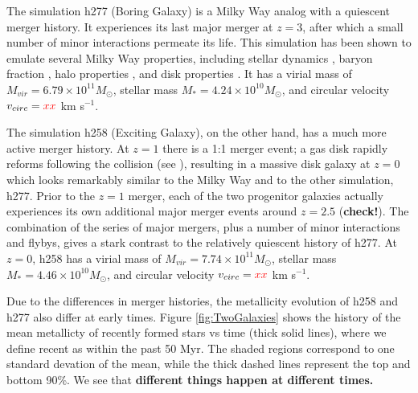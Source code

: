 \documentclass[nofootinbib,twocolumn,prd]{emulateapj}
\newcommand\editremark[1]{{\color{red}#1}}
\newcommand\msun{M_\odot}
\begin{document}
The simulation h277 (Boring Galaxy) is a Milky Way analog with a
quiescent merger history.  It experiences its last major merger at $z
= 3$, after which a small number of minor interactions permeate its
life.  This simulation has been shown to emulate several Milky Way
properties, including stellar dynamics
\citep{Loebman12,Loebman14,Kassin14}, baryon fraction
\citep{Munshi13}, halo properties \citep{Zolotov09,Zolotov10}, and
  disk properties \citep{Brooks11}.  It has a virial mass of $M_{vir}
  = 6.79 \times 10^{11}  \msun$, stellar mass $M_* = 4.24 \times
  10^{10} \msun$, and circular velocity $v_{circ} = \editremark{xx}$ km s$^{-1}$.

  The simulation h258 (Exciting Galaxy), on the other hand, has a much
  more active merger history.  At $z = 1$ there is a 1:1 merger event;
  a gas disk rapidly reforms following the collision (see
  \citet{Governato09}), resulting in a massive disk galaxy at $z = 0$
  which looks remarkably similar to the Milky Way and to the other
  simulation, h277.  Prior to the $z = 1$ merger, each of the two
  progenitor galaxies actually experiences its own additional major
  merger events around $z = 2.5$ ({\bf check!}).  The combination of
  the series of major mergers, plus a number of minor interactions and
  flybys, gives a stark contrast to the relatively quiescent history
  of h277.  At $z = 0$, h258 has a virial mass of $M_{vir} = 7.74
  \times 10^{11} \msun$, stellar mass $M_* = 4.46 \times 10^{10} \msun$, and circular velocity $v_{circ} = \editremark{xx}$ km s$^{-1}$.


  Due to the differences in merger histories, the metallicity
  evolution of h258 and h277 also differ at early times.  Figure
  \ref{fig:TwoGalaxies} shows the history of the mean metallicty of
  recently formed stars vs time (thick solid lines), where we define
  recent as within the past 50 Myr.  The shaded regions correspond to
  one standard devation of the mean, while the thick dashed lines
  represent the top and bottom 90\%.  We see that {\bf different things happen at different times.}
\end{document}
